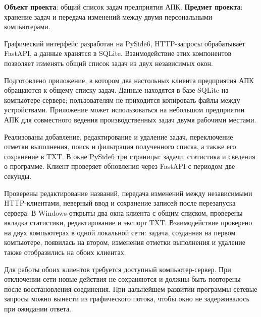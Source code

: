 \documentclass[14pt,a4paper]{extreport}
\begin{document}
\textbf{Объект проекта}: общий список задач предприятия АПК. \textbf{Предмет проекта}: хранение задач и передача изменений между двумя персональными компьютерами.

Графический интерфейс разработан на PySide6, HTTP-запросы обрабатывает FastAPI, а данные хранятся в SQLite. Взаимодействие этих компонентов позволяет изменять общий список задач из двух независимых окон.




\conclusion
Подготовлено приложение, в котором два настольных клиента предприятия АПК обращаются к общему списку задач. Данные находятся в базе SQLite на компьютере-сервере; пользователям не приходится копировать файлы между устройствами. Приложение может использоваться на небольшом предприятии АПК для совместного ведения производственных задач двумя рабочими местами.

Реализованы добавление, редактирование и удаление задач, переключение отметки выполнения, поиск и фильтрация полученного списка, а также его сохранение в TXT. В окне PySide6 три страницы: задачи, статистика и сведения о программе. Клиент проверяет обновления через FastAPI с периодом две секунды.

Проверены редактирование названий, передача изменений между независимыми HTTP-клиентами, неверный ввод и сохранение записей после перезапуска сервера. В Windows открыты два окна клиента с общим списком, проверены вкладка статистики, редактирование и экспорт TXT. Взаимодействие проверено на двух компьютерах в одной локальной сети: задача, созданная на первом компьютере, появилась на втором, изменения отметки выполнения и удаление также отобразились на обоих клиентах.

Для работы обоих клиентов требуется доступный компьютер-сервер. При отключении сети новые действия не сохраняются и должны быть повторены после восстановления соединения. При дальнейшем развитии программы сетевые запросы можно вынести из графического потока, чтобы окно не задерживалось при ожидании ответа.
\clearpage

\clearpage

\end{document}
